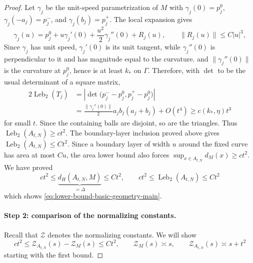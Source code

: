 \documentclass{article}
\newcommand{\Leb}{\operatorname{Leb}}
\numberwithin{equation}{section}
\newcommand{\Zcal}{\mathcal{Z}}
\begin{document}
\begin{proof}
Let $\gamma_j$ be the unit-speed parametrization of $M$ with
$\gamma_j(0)=p_j^0$, $\gamma_j(-a_j)=p_j^-$, and
$\gamma_j(b_j)=p_j^+$. The local expansion
\citep[Lemma~2(iv)]{aamari2019nonasymptotic} gives
\[
 \gamma_j(u)=p_j^0+u\gamma_j'(0)+\frac{u^2}{2}\gamma_j''(0)+R_j(u),
 \qquad
 \|R_j(u)\|\le C|u|^3,
\]
Since $\gamma_j$ has unit speed, $\gamma_j'(0)$ is its unit tangent, while $\gamma_j''(0)$ is perpendicular to it and has magnitude equal to the curvature.
and $\|\gamma_j''(0)\|$ is the curvature at $p_j^0$, hence is at least
$k_*$ on $\Gamma$. Therefore, with $\operatorname{det}$ to be the usual determinant of a square matrix,
\[
 \begin{aligned}
 2\Leb_2(T_j)
 &=\left|\det\bigl(
     p_j^- -p_j^0,
     p_j^+ -p_j^0
   \bigr)\right|\\
 &=\frac{\|\gamma_j''(0)\|}{2}a_jb_j(a_j+b_j)+O(t^4)
 \ge c(k_*,\eta)t^3
 \end{aligned}
\]
for small $t$. Since the containing balls are disjoint, so are the
triangles. Thus
$\Leb_2(A_{t,N})\ge ct^2$. The boundary-layer inclusion proved above gives
$\Leb_2(A_{t,N})\le Ct^2$. Since a boundary layer of width
$u$ around the fixed curve has area at most $Cu$, the area lower bound also
forces $\sup_{x\in A_{t,N}}d_M(x)\ge ct^2$. We have proved 
\begin{equation}
 ct^2\le \underbrace{d_H(A_{t,N},M)}_{=\Delta}\le Ct^2, \qquad ct^2\le \Leb_2(A_{t,N})\le Ct^2 
\label{eq:lower-bound-basic-geometry}
\end{equation}
which shows \eqref{eq:lower-bound-basic-geometry-main}.

\paragraph{Step 2: comparison of the normalizing constants.} 


Recall that $\Zcal$ denotes the normalizing constants. We will show
\begin{equation*}
 ct^2\le\mathcal Z_{A_{t,N}}(s)-\mathcal Z_M(s)\le Ct^2,
 \qquad
 \mathcal Z_M(s)\asymp s,
 \qquad
 \mathcal Z_{A_{t,N}}(s)\asymp s+t^2
\end{equation*}
starting with the first bound.


\end{proof}
\end{document}
